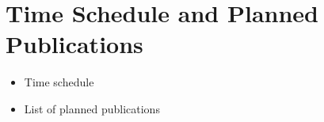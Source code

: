 \section{Time Schedule and Planned Publications}
\label{sec:Time Schedule and Planned Publications}

\begin{itemize}
	\item Time schedule
	\item List of planned publications
\end{itemize}
